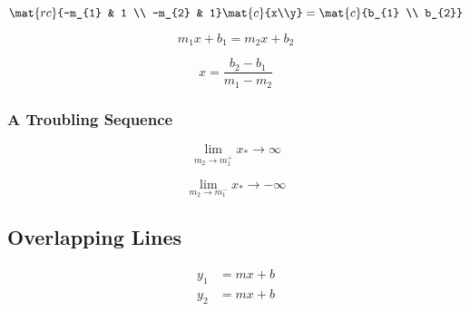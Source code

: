   \begin{equation*}   %
    \mat{rc}{-m_{1} & 1 \\ -m_{2} & 1} \mat{c}{x\\y} = \mat{c}{b_{1} \\ b_{2}}
  \end{equation*}

  \begin{equation*}   %
    m_{1} x + b_{1} = m_{2} x + b_{2}
  \end{equation*}

  \begin{equation*}   %
    x = \frac{b_{2} - b_{1}} {m_{1} - m_{2}}
  \end{equation*}

\subsubsection{A Troubling Sequence}  %

  \begin{equation*}   %
    \lim_{m_{2}\to m_{1}^{+}} x_{*} \to \infty
  \end{equation*}

  \begin{equation*}   %
    \lim_{m_{2}\to m_{1}^{-}} x_{*} \to -\infty
  \end{equation*}

\subsection{Overlapping Lines}  %

  \begin{equation*}   %
    \begin{split}
      y_{1} &= mx + b \\
      y_{2} &= mx + b
    \end{split}
  \end{equation*}

